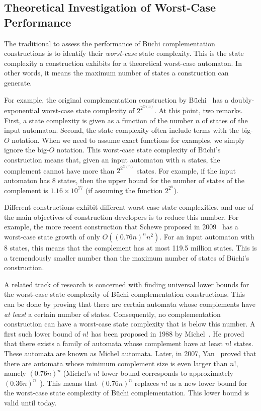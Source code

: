 \subsection{Theoretical Investigation of Worst-Case Performance}
\label{1_theoretical}
The traditional to assess the performance of Büchi complementation constructions is to identify their \textit{worst-case} state complexity. This is the state complexity a construction exhibits for a theoretical worst-case automaton. In other words, it means the maximum number of states a construction can generate.

For example, the original complementation construction by Büchi~\cite{buchi1960decision} has a doubly-exponential worst-case state complexity of $2^{2^{O\left(n\right)}}$. At this point, two remarks. First, a state complexity is given as a function of the number $n$ of states of the input automaton. Second, the state complexity often include terms with the big-$O$ notation. When we need to assume exact functions for examples, we simply ignore the big-$O$ notation. This worst-case state complexity of Büchi's construction means that, given an input automaton with $n$ states, the complement cannot have more than $2^{2^{O\left(n\right)}}$ states. For example, if the input automaton has 8 states, then the upper bound for the number of states of the complement is $1.16 \times 10^{77}$ (if assuming the function $2^{2^n}$).

Different constructions exhibit different worst-case state complexities, and one of the main objectives of construction developers is to reduce this number. For example, the more recent construction that Schewe proposed in 2009~\cite{schewe2009buchi} has a worst-case state growth of only $O((0.76n)^nn^2)$. For an input automaton with 8 states, this means that the complement has at most 119.5 million states. This is a tremendously smaller number than the maximum number of states of Büchi's construction.

A related track of research is concerned with finding universal lower bounds for the worst-case state complexity of Büchi complementation constructions. This can be done by proving that there are certain automata whose complements  have \textit{at least} a certain number of states. Consequently, no complementation construction can have a worst-case state complexity that is below this number. A first such lower bound of $n!$ has been proposed in 1988 by Michel~\cite{michel1988}. He proved that there exists a family of automata whose complement have at least $n!$ states. These automata are known as Michel automata. Later, in 2007, Yan~\cite{DBLP:journals/corr/abs-0802-1226} proved that there are automata whose minimum complement size is even larger than $n!$, namely $(0.76n)^n$ (Michel's $n!$ lower bound corresponds to approximately $(0.36n)^n$~\cite{DBLP:journals/corr/abs-0802-1226}). This means that $(0.76n)^n$ replaces $n!$ as a new lower bound for the worst-case state complexity of Büchi complementation. This lower bound is valid until today.

